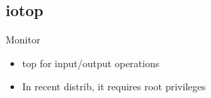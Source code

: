 \subsection{iotop}

\begin{frame}[fragile]{Monitor}
  \begin{itemize}
    \pause \item top for input/output operations
    \pause \item In recent distrib, it requires root privileges
  \end{itemize}
\end{frame}
